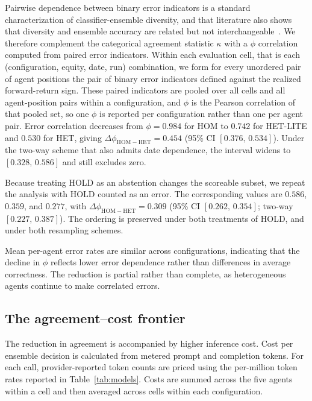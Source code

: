 \documentclass{ieeeaccess}
\begin{document}
Pairwise dependence between binary error indicators is a standard
characterization of classifier-ensemble diversity, and that literature also shows
that diversity and ensemble accuracy are related but not
interchangeable~\cite{kuncheva2003diversity}. We therefore complement the
categorical agreement statistic $\kappa$ with a $\phi$ correlation computed from
paired error indicators. Within each evaluation cell, that is each
(configuration, equity, date, run)
combination, we form for every unordered pair of agent positions the pair of
binary error indicators defined against the realized forward-return sign. These
paired indicators are pooled over all cells and all agent-position pairs within a
configuration, and $\phi$ is the Pearson correlation of that pooled set, so one
$\phi$ is reported per configuration rather than one per agent pair. Error
correlation decreases from $\phi = 0.984$ for HOM to $0.742$ for HET-LITE and
$0.530$ for HET, giving $\Delta\phi_{\mathrm{HOM-HET}} = 0.454$
(95\% CI $[0.376,\,0.534]$). Under the two-way scheme that also admits date
dependence, the interval widens to $[0.328,\,0.586]$ and still excludes zero.

Because treating HOLD as an abstention changes the scoreable subset, we repeat
the analysis with HOLD counted as an error. The corresponding values are $0.586$,
$0.359$, and $0.277$, with $\Delta\phi_{\mathrm{HOM-HET}} = 0.309$
(95\% CI $[0.262,\,0.354]$; two-way $[0.227,\,0.387]$). The ordering is preserved
under both treatments of HOLD, and under both resampling schemes.

Mean per-agent error rates are similar across configurations, indicating that the
decline in $\phi$ reflects lower error dependence rather than differences in
average correctness. The reduction is partial rather than complete, as
heterogeneous agents continue to make correlated errors.

\subsection{The agreement--cost frontier}
\label{subsec:frontier}
The reduction in agreement is accompanied by higher inference cost. Cost per
ensemble decision is calculated from metered prompt and completion tokens. For
each call, provider-reported token counts are priced using the per-million token
rates reported in Table~\ref{tab:models}. Costs are summed across the five agents
within a cell and then averaged across cells within each configuration.
\end{document}
